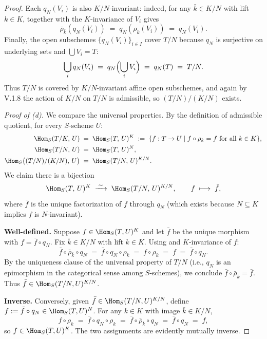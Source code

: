 \begin{proof}
Each $q_N(V_i)$ is also $K/N$-invariant: indeed, for any $\bar k \in K/N$ with lift $k \in K$,  together with the $K$-invariance of $V_i$ gives
\[
\bar\rho_{\bar k}(q_N(V_i)) \;=\; q_N(\rho_k(V_i)) \;=\; q_N(V_i).
\]
Finally, the open subschemes $\{q_N(V_i)\}_{i \in I}$ cover $T/N$ because $q_N$ is surjective on underlying sets and $\bigcup V_i = T$:
\[
\bigcup_i q_N(V_i) \;=\; q_N\Bigl(\bigcup_i V_i\Bigr) \;=\; q_N(T) \;=\; T/N.
\]
Thus $T/N$ is covered by $K/N$-invariant affine open subschemes, and again by V.1.8 the action of $K/N$ on $T/N$ is admissible, so $(T/N)/(K/N)$ exists.

\medskip
\textit{Proof of (d).}
We compare the universal properties. By the definition of admissible quotient, for every $S$-scheme $U$:
\begin{align}
\Hom_S(T/K,\, U) &\;=\; \Hom_S(T,\, U)^K \;:=\; \{f : T \to U \mid f \circ \rho_k = f \text{ for all } k \in K\}, \label{eq:univ_TK}\\
\Hom_S(T/N,\, U) &\;=\; \Hom_S(T,\, U)^N, \label{eq:univ_TN}\\
\Hom_S\bigl((T/N)/(K/N),\, U\bigr) &\;=\; \Hom_S(T/N,\, U)^{K/N}. \label{eq:univ_TNK}
\end{align}
We claim there is a bijection
\begin{equation}\label{eq:invariant_bijection}
\Hom_S(T,\, U)^K \;\xrightarrow{\;\sim\;}\; \Hom_S(T/N,\, U)^{K/N}, \qquad f \;\longmapsto\; \bar f,
\end{equation}
where $\bar f$ is the unique factorization of $f$ through $q_N$ (which exists because $N \subseteq K$ implies $f$ is $N$-invariant).

\textbf{Well-defined.} Suppose $f \in \Hom_S(T,U)^K$ and let $\bar f$ be the unique morphism with $f = \bar f \circ q_N$. Fix $\bar k \in K/N$ with lift $k \in K$. Using  and $K$-invariance of $f$:
\[
\bar f \circ \bar\rho_{\bar k} \circ q_N \;=\; \bar f \circ q_N \circ \rho_k \;=\; f \circ \rho_k \;=\; f \;=\; \bar f \circ q_N.
\]
By the uniqueness clause of the universal property of $T/N$ (i.e., $q_N$ is an epimorphism in the categorical sense among $S$-schemes), we conclude $\bar f \circ \bar\rho_{\bar k} = \bar f$. Thus $\bar f \in \Hom_S(T/N, U)^{K/N}$.

\textbf{Inverse.} Conversely, given $\bar f \in \Hom_S(T/N, U)^{K/N}$, define $f := \bar f \circ q_N \in \Hom_S(T, U)^N$. For any $k \in K$ with image $\bar k \in K/N$,
\[
f \circ \rho_k \;=\; \bar f \circ q_N \circ \rho_k \;=\; \bar f \circ \bar\rho_{\bar k} \circ q_N \;=\; \bar f \circ q_N \;=\; f,
\]
so $f \in \Hom_S(T, U)^K$. The two assignments are evidently mutually inverse.


\end{proof}
